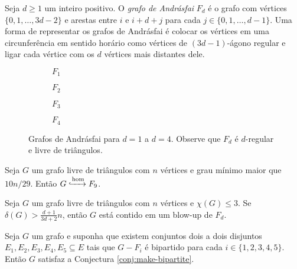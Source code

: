 \begin{definition}
  Seja $d \geq 1$ um inteiro positivo.
  O \emph{grafo de Andrásfai} $F_d$ é o grafo com vértices $\{0,1,\dots,3d-2\}$ e arestas entre $i$ e $i+d+j$ para cada $j \in \{0,1,\dots,d-1\}$.
  Uma forma de representar os grafos de Andrásfai é colocar os vértices em uma circunferência em sentido horário como vértices de $(3d-1)$-ágono regular e ligar cada vértice com os $d$ vértices mais distantes dele.

  \begin{figure}[htbp]
    \centering

    \begin{subfigure}[b]{0.22\textwidth}
      \centering
      \caption*{$F_1$}
    \end{subfigure}
    \hfill
    \begin{subfigure}[b]{0.22\textwidth}
      \centering
      \caption*{$F_2$}
    \end{subfigure}
    \hfill
    \begin{subfigure}[b]{0.22\textwidth}
      \centering
      \caption*{$F_3$}
    \end{subfigure}
    \hfill
    \begin{subfigure}[b]{0.22\textwidth}
      \centering
      \caption*{$F_4$}
    \end{subfigure}

    \caption{Grafos de Andrásfai para $d = 1$ a $d = 4$. Observe que $F_d$ é $d$-regular e livre de triângulos.}
  \end{figure}
\end{definition}

\begin{theorem}  \label{thm:jin}
  Seja $G$ um grafo livre de triângulos com $n$ vértices e grau mínimo maior que $10n/29$.
  Então $G \xhookrightarrow{\text{hom}} F_9$.
\end{theorem}

\begin{theorem}  \label{thm:hom-to-Fd}
  Seja $G$ um grafo livre de triângulos com $n$ vértices e $\chi(G) \leq 3$.
  Se $\delta(G) > \frac{d+1}{3d+2}n$, então $G$ está contido em um blow-up de $F_d$.
\end{theorem}

\begin{lemma} \label{lem:odd-transversal}
  Seja $G$ um grafo e suponha que existem conjuntos dois a dois disjuntos $E_1,E_2,E_3,E_4,E_5 \subseteq E$ tais que
  $G-F_i$ é bipartido para cada $i \in \{1,2,3,4,5\}$.
  Então $G$ satisfaz a Conjectura \ref{conj:make-bipartite}.
\end{lemma}

